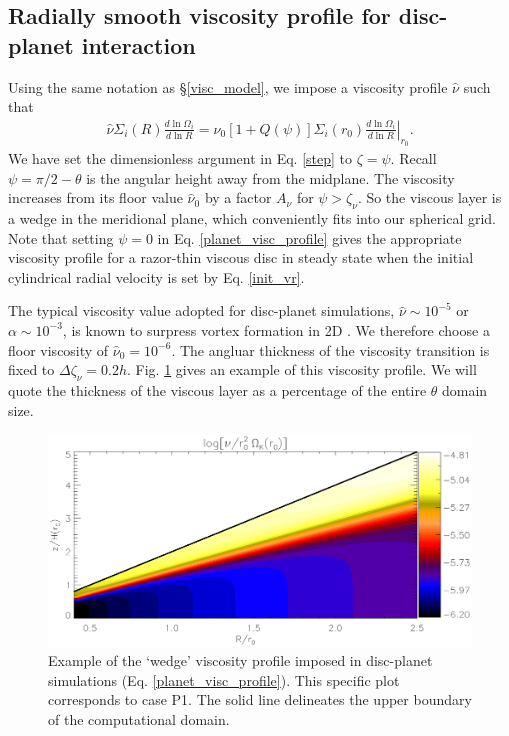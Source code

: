 \subsection{Radially smooth viscosity profile for disc-planet
  interaction}\label{planet_visc_mode} 
Using the same notation as \S\ref{visc_model}, we impose a viscosity
profile $\hat{\nu}$ such that 
\begin{align}\label{planet_visc_profile}
  \hat{\nu}\Sigma_i(R)\frac{d\ln{\Omega_i}}{d\ln{R}} =
  \hat{\nu}_0\left[1+Q(\psi)\right]\Sigma_i(r_0)\left.\frac{d\ln{\Omega_i}}{d\ln{R}}\right|_{r_0}.      
\end{align}
We have set the dimensionless argument in Eq. \ref{step} to
$\zeta=\psi$. Recall $\psi=\pi/2-\theta$ is the angular height away from the midplane. 
The viscosity increases from its floor value $\hat{\nu}_0$ by a factor
$A_\nu$ for $\psi > \zeta_\nu$. So the viscous layer is 
a wedge in the meridional plane, which conveniently fits into our
spherical grid. Note that setting $\psi = 0$ in Eq. \ref{planet_visc_profile} gives
the appropriate viscosity profile for a razor-thin viscous disc in
steady state when the initial cylindrical radial velocity 
is set by Eq. \ref{init_vr}. 

The typical viscosity value adopted for disc-planet simulations, 
$\hat{\nu}\sim 10^{-5}$ or $\alpha\sim 10^{-3}$, is known to surpress
vortex formation in 2D \citep{valborro07, mudryk09}. 
We therefore choose a floor viscosity of $\hat{\nu}_0=10^{-6}$.
The angluar thickness of the viscosity transition is fixed to
$\Delta\zeta_\nu = 0.2h$. Fig. \ref{planet_visc2d} gives an example of this
viscosity profile. We will quote the thickness of the viscous layer as a 
percentage of the entire $\theta$ domain size. 

\begin{figure}
  \centering
  \includegraphics[width=\linewidth]{figures/pdisk_visc2d_planet}
  \caption{Example of the `wedge' viscosity profile
    imposed in disc-planet simulations (Eq. \ref{planet_visc_profile}). This specific plot
    corresponds to case P1. The solid line
    delineates the upper boundary of the computational domain.
    \label{planet_visc2d}}
\end{figure}

